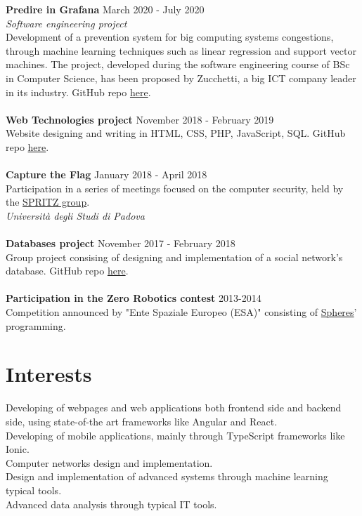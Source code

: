 \documentclass[margin, 10pt]{res}
\begin{document}
\begin{resume}
\textbf{Predire in Grafana} \hfill March 2020 - July 2020 \\
\textit{Software engineering project} \\
Development of a prevention system for big computing systems congestions, through machine learning techniques such as linear regression and support vector machines. The project, developed during the software engineering course of BSc in Computer Science, has been proposed by Zucchetti, a big ICT company leader in its industry. GitHub repo \href{https://github.com/CoffeeCodeSWE/swe-predire-in-grafana}{here}. \\ \\ 
\textbf{Web Technologies project} \hfill November 2018 - February 2019 \\
Website designing and writing in HTML, CSS, PHP, JavaScript, SQL. GitHub repo \href{https://github.com/enricobu96/TecWebUNIPD}{here}.\\ \\
\textbf{Capture the Flag} \hfill January 2018 - April 2018 \\
Participation in a series of meetings focused on the computer security, held by the \href{https://github.com/enricobu96/TecWebUNIPD}{SPRITZ group}. \\
\textit{Università degli Studi di Padova} \\ \\
\textbf{Databases project} \hfill November 2017 - February 2018 \\
Group project consising of designing and implementation of a social network's database. GitHub repo \href{https://github.com/enricobu96/DB1718}{here}. \\ \\
\textbf{Participation in the Zero Robotics contest} \hfill 2013-2014 \\
Competition announced by "Ente Spaziale Europeo (ESA)" consisting of \href{https://www.esa.int/Science_Exploration/Human_and_Robotic_Exploration/Education/Robot_Spheres_in_zero-gravity_action}{Spheres}' programming.


\section{Interests}
Developing of webpages and web applications both frontend side and backend side, using state-of-the art frameworks like Angular and React. \\
Developing of mobile applications, mainly through TypeScript frameworks like Ionic. \\
Computer networks design and implementation. \\
Design and implementation of advanced systems through machine learning typical tools. \\
Advanced data analysis through typical IT tools.




\end{resume}
\end{document}

